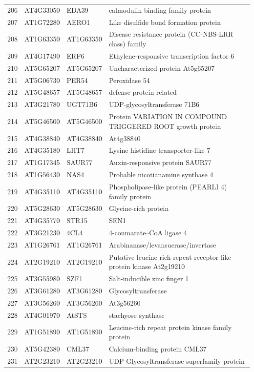 \documentclass[11pt]{article}
\begin{document}
\begin{center}
\begin{tabular}{rlll}
206 & AT4G33050 & EDA39 & calmodulin-binding family protein\\
207 & AT1G72280 & AERO1 & Like disulfide bond formation protein\\
208 & AT1G63350 & AT1G63350 & Disease resistance protein (CC-NBS-LRR class) family\\
209 & AT4G17490 & ERF6 & Ethylene-responsive transcription factor 6\\
210 & AT5G65207 & AT5G65207 & Uncharacterized protein At5g65207\\
211 & AT5G06730 & PER54 & Peroxidase 54\\
212 & AT5G48657 & AT5G48657 & defense protein-related\\
213 & AT3G21780 & UGT71B6 & UDP-glycosyltransferase 71B6\\
214 & AT5G46500 & AT5G46500 & Protein VARIATION IN COMPOUND TRIGGERED ROOT growth protein\\
215 & AT4G38840 & AT4G38840 & At4g38840\\
216 & AT4G35180 & LHT7 & Lysine histidine transporter-like 7\\
217 & AT1G17345 & SAUR77 & Auxin-responsive protein SAUR77\\
218 & AT1G56430 & NAS4 & Probable nicotianamine synthase 4\\
219 & AT4G35110 & AT4G35110 & Phospholipase-like protein (PEARLI 4) family protein\\
220 & AT5G28630 & AT5G28630 & Glycine-rich protein\\
221 & AT4G35770 & STR15 & SEN1\\
222 & AT3G21230 & 4CL4 & 4-coumarate--CoA ligase 4\\
223 & AT1G26761 & AT1G26761 & Arabinanase/levansucrase/invertase\\
224 & AT2G19210 & AT2G19210 & Putative leucine-rich repeat receptor-like protein kinase At2g19210\\
225 & AT3G55980 & SZF1 & Salt-inducible zinc finger 1\\
226 & AT3G61280 & AT3G61280 & Glycosyltransferase\\
227 & AT3G56260 & AT3G56260 & At3g56260\\
228 & AT4G01970 & AtSTS & stachyose synthase\\
229 & AT1G51890 & AT1G51890 & Leucine-rich repeat protein kinase family protein\\
230 & AT5G42380 & CML37 & Calcium-binding protein CML37\\
231 & AT2G23210 & AT2G23210 & UDP-Glycosyltransferase superfamily protein\\

\end{tabular}
\end{center}
\end{document}
